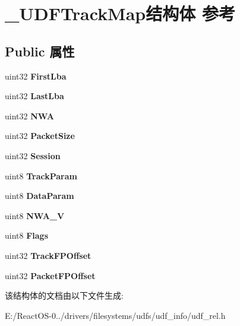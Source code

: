 \hypertarget{struct___u_d_f_track_map}{}\section{\+\_\+\+U\+D\+F\+Track\+Map结构体 参考}
\label{struct___u_d_f_track_map}
\subsection*{Public 属性}
\begin{DoxyCompactItemize}
\item 
\mbox{\label{struct___u_d_f_track_map_a0b59904ddaf5e315697211e7f83b3130}} 
uint32 {\bfseries First\+Lba}
\item 
\mbox{\label{struct___u_d_f_track_map_af346eae85635d68f7e7df54ffb8f46ff}} 
uint32 {\bfseries Last\+Lba}
\item 
\mbox{\label{struct___u_d_f_track_map_af2a6a63c69951467bf92b1674a646177}} 
uint32 {\bfseries N\+WA}
\item 
\mbox{\label{struct___u_d_f_track_map_abfc4ff5648060fe9faf052ee5f5aedce}} 
uint32 {\bfseries Packet\+Size}
\item 
\mbox{\label{struct___u_d_f_track_map_a5d37c4ce6e6e80a22025bd28bd5d2220}} 
uint32 {\bfseries Session}
\item 
\mbox{\label{struct___u_d_f_track_map_aa931e491e9eefa243ae7fca38d771bbe}} 
uint8 {\bfseries Track\+Param}
\item 
\mbox{\label{struct___u_d_f_track_map_a0260444de13ea52a454e9ed21d4b61d9}} 
uint8 {\bfseries Data\+Param}
\item 
\mbox{\label{struct___u_d_f_track_map_a32b7f4dd7b573f07371ce43ead0991a1}} 
uint8 {\bfseries N\+W\+A\+\_\+V}
\item 
\mbox{\label{struct___u_d_f_track_map_a012ded6311e1e457afceb072f47cbe12}} 
uint8 {\bfseries Flags}
\item 
\mbox{\label{struct___u_d_f_track_map_a5036817fac8c87b96b60ff4329a02611}} 
uint32 {\bfseries Track\+F\+P\+Offset}
\item 
\mbox{\label{struct___u_d_f_track_map_a3934d5194bd686438b976cd4dc8ec651}} 
uint32 {\bfseries Packet\+F\+P\+Offset}
\end{DoxyCompactItemize}


该结构体的文档由以下文件生成\+:\begin{DoxyCompactItemize}
\item 
E\+:/\+React\+O\+S-\/0../drivers/filesystems/udfs/udf\+\_\+info/udf\+\_\+rel.\+h\end{DoxyCompactItemize}
